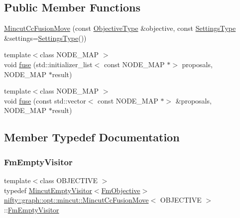 \subsection*{Public Member Functions}
\begin{DoxyCompactItemize}
\item 
\hyperlink{classnifty_1_1graph_1_1opt_1_1mincut_1_1MincutCcFusionMove_a9f1239db92785db317709b8aee8d1c81}{Mincut\+Cc\+Fusion\+Move} (const \hyperlink{classnifty_1_1graph_1_1opt_1_1mincut_1_1MincutCcFusionMove_aa01f8621f491c8f77e106950d7525c37}{Objective\+Type} \&objective, const \hyperlink{structnifty_1_1graph_1_1opt_1_1mincut_1_1MincutCcFusionMove_1_1SettingsType}{Settings\+Type} \&settings=\hyperlink{structnifty_1_1graph_1_1opt_1_1mincut_1_1MincutCcFusionMove_1_1SettingsType}{Settings\+Type}())
\item 
{\footnotesize template$<$class N\+O\+D\+E\+\_\+\+M\+AP $>$ }\\void \hyperlink{classnifty_1_1graph_1_1opt_1_1mincut_1_1MincutCcFusionMove_a9033e25b234036ee255fc1f1c4bc4574}{fuse} (std\+::initializer\+\_\+list$<$ const N\+O\+D\+E\+\_\+\+M\+AP $\ast$$>$ proposals, N\+O\+D\+E\+\_\+\+M\+AP $\ast$result)
\item 
{\footnotesize template$<$class N\+O\+D\+E\+\_\+\+M\+AP $>$ }\\void \hyperlink{classnifty_1_1graph_1_1opt_1_1mincut_1_1MincutCcFusionMove_a6cf6c0686c76b97d8e93edf1b0488b7f}{fuse} (const std\+::vector$<$ const N\+O\+D\+E\+\_\+\+M\+AP $\ast$$>$ \&proposals, N\+O\+D\+E\+\_\+\+M\+AP $\ast$result)
\end{DoxyCompactItemize}


\subsection{Member Typedef Documentation}
\mbox{\label{classnifty_1_1graph_1_1opt_1_1mincut_1_1MincutCcFusionMove_a0157a84ec61e81ebdff1fb64515201d0}} 
\subsubsection{\texorpdfstring{Fm\+Empty\+Visitor}{FmEmptyVisitor}}
{\footnotesize\ttfamily template$<$class O\+B\+J\+E\+C\+T\+I\+VE $>$ \\
typedef \hyperlink{namespacenifty_1_1graph_1_1opt_1_1mincut_abaeb42be72a153c73386cda5564721b2}{Mincut\+Empty\+Visitor}$<$\hyperlink{classnifty_1_1graph_1_1opt_1_1mincut_1_1MincutCcFusionMove_a5f30047aa697335e354346a6c1c2f8ad}{Fm\+Objective}$>$ \hyperlink{classnifty_1_1graph_1_1opt_1_1mincut_1_1MincutCcFusionMove}{nifty\+::graph\+::opt\+::mincut\+::\+Mincut\+Cc\+Fusion\+Move}$<$ O\+B\+J\+E\+C\+T\+I\+VE $>$\+::\hyperlink{classnifty_1_1graph_1_1opt_1_1mincut_1_1MincutCcFusionMove_a0157a84ec61e81ebdff1fb64515201d0}{Fm\+Empty\+Visitor}}

